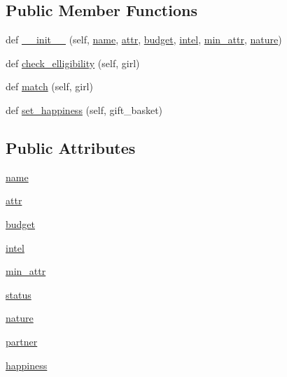 \subsection*{Public Member Functions}
\begin{DoxyCompactItemize}
\item 
def \hyperlink{classboys_1_1boy__uninherited_1_1_boy_a0e3ae5ced04e7737f82917d5272860c0}{\+\_\+\+\_\+init\+\_\+\+\_\+} (self, \hyperlink{classboys_1_1boy__uninherited_1_1_boy_a4009413656c9d8057fc54545dce28df8}{name}, \hyperlink{classboys_1_1boy__uninherited_1_1_boy_afac2cde2111761c12ac48f3339f4c659}{attr}, \hyperlink{classboys_1_1boy__uninherited_1_1_boy_a0abd7cec036a08b7d7fb23db1709246d}{budget}, \hyperlink{classboys_1_1boy__uninherited_1_1_boy_a8069384d8d8dd16683ba292ac2b043b0}{intel}, \hyperlink{classboys_1_1boy__uninherited_1_1_boy_a95366dbf37df96f53c361a980791f4e7}{min\+\_\+attr}, \hyperlink{classboys_1_1boy__uninherited_1_1_boy_aea7eb7c4e32a8490a7280a8cb99f036d}{nature})
\item 
def \hyperlink{classboys_1_1boy__uninherited_1_1_boy_a833caeabdf27b25b3435776e01536b29}{check\+\_\+elligibility} (self, girl)
\item 
def \hyperlink{classboys_1_1boy__uninherited_1_1_boy_a1a8cc5381fb5b2fbd68698fc0791db97}{match} (self, girl)
\item 
def \hyperlink{classboys_1_1boy__uninherited_1_1_boy_a7a7071d13af4d9d43dd6a4eddbb4d55e}{set\+\_\+happiness} (self, gift\+\_\+basket)
\end{DoxyCompactItemize}
\subsection*{Public Attributes}
\begin{DoxyCompactItemize}
\item 
\hyperlink{classboys_1_1boy__uninherited_1_1_boy_a4009413656c9d8057fc54545dce28df8}{name}
\item 
\hyperlink{classboys_1_1boy__uninherited_1_1_boy_afac2cde2111761c12ac48f3339f4c659}{attr}
\item 
\hyperlink{classboys_1_1boy__uninherited_1_1_boy_a0abd7cec036a08b7d7fb23db1709246d}{budget}
\item 
\hyperlink{classboys_1_1boy__uninherited_1_1_boy_a8069384d8d8dd16683ba292ac2b043b0}{intel}
\item 
\hyperlink{classboys_1_1boy__uninherited_1_1_boy_a95366dbf37df96f53c361a980791f4e7}{min\+\_\+attr}
\item 
\hyperlink{classboys_1_1boy__uninherited_1_1_boy_a54bb9865e7dfb35e804b976d2d94a174}{status}
\item 
\hyperlink{classboys_1_1boy__uninherited_1_1_boy_aea7eb7c4e32a8490a7280a8cb99f036d}{nature}
\item 
\hyperlink{classboys_1_1boy__uninherited_1_1_boy_aa70bd494f431eff2fad089ac5ccf9403}{partner}
\item 
\hyperlink{classboys_1_1boy__uninherited_1_1_boy_a7de8536ac2f0ddaaf0dd4b7ffbba7e87}{happiness}
\end{DoxyCompactItemize}


